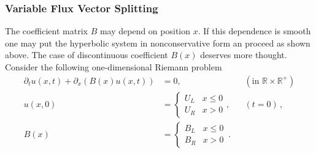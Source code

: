 \documentclass[a4paper,12pt]{article}
\theoremstyle{definition}
\theoremstyle{definition}
\begin{document}
\subsubsection{Variable Flux Vector Splitting}

The coefficient matrix $B$ may depend on position $x$. If this dependence is smooth
one may put the hyperbolic system in nonconservative form an proceed as shown
above. The case of discontinuous coefficient $B(x)$ deserves more thought.
Consider the following one-dimensional Riemann problem
\begin{subequations}
	\begin{align}\label{eq:DiscontinuousRiemann}
	\partial_t u(x,t) + \partial_x (B(x) u(x,t)) &= 0, &&(\text{in $\mathbb{R}\times\mathbb{R}^+$})\\
	u(x,0) &= \left\{\begin{array}{ll}
	U_L & x \leq 0\\ U_R & x > 0
	\end{array}\right ., &&(t=0)\,,\\
	B(x) &= \left\{\begin{array}{ll}
	B_L & x \leq 0\\ B_R & x > 0
	\end{array}\right. \,.
	\end{align}
\end{subequations}
\end{document}
